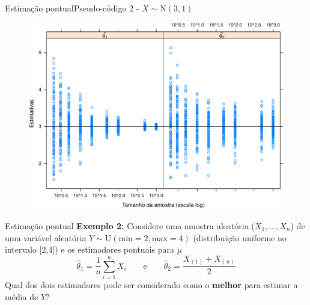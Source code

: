 \documentclass[10pt]{beamer}\usepackage[]{graphicx}\usepackage[]{color}
\providecommand{\N}{\text{N}}
\theoremstyle{definition}
\begin{document}
\begin{frame}[fragile]{Estimação pontual}{Pseudo-código 2 - $X \sim \N(3,1)$}
  \begin{figure}[h]
    \centering
    \includegraphics[width=1\textwidth]{consistencia_normal-crop}
  \end{figure}
\end{frame}

\begin{frame}[fragile]{Estimação pontual}
  \textbf{Exemplo 2:} Considere uma amostra aleatória ($X_1, \ldots,
  X_n$) de uma variável aleatória $Y \sim \text{U}(\text{min} = 2,
  \text{max} = 4)$ (distribuição uniforme no intervalo [2,4]) e os
  estimadores pontuais para $\mu$
  \begin{equation*}
    \hat{\theta}_1 = \frac{1}{n} \sum_{i=1}^n X_i \qquad \text{e} \qquad
    \hat{\theta}_2 = \frac{X_{(1)}+X_{(n)}}{2}
  \end{equation*}
  Qual dos dois estimadores pode ser considerado como o \textbf{melhor}
  para estimar a média de $Y$? \\~\\
\end{frame}
\end{document}
